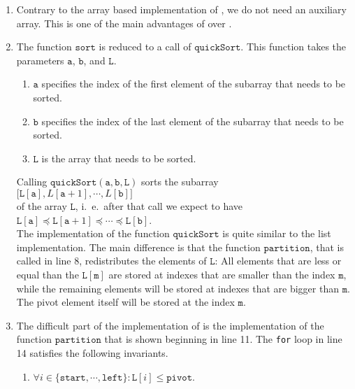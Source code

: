 \begin{enumerate}
\item Contrary to the array based implementation of , we do not need an auxiliary
      array.  This is one of the main advantages of  over .
\item The function $\mathtt{sort}$ is reduced to a call of $\mathtt{quickSort}$.  This function
      takes the parameters $\mathtt{a}$, $\mathtt{b}$, and $\mathtt{L}$.  
      \begin{enumerate}
      \item $\mathtt{a}$ specifies the index of the first element of the subarray that needs to be
            sorted.
      \item $\mathtt{b}$ specifies the index of the last element of the subarray that needs to be
            sorted. 
      \item $\mathtt{L}$ is the array that needs to be sorted.
      \end{enumerate}
      Calling $\mathtt{quickSort}(\mathtt{a}, \mathtt{b}, \mathtt{L})$ sorts the subarray \\[0.2cm]
      \hspace*{1.3cm} 
      $\bigl[\mathtt{L}[\mathtt{a}], L[\mathtt{a}+1], \cdots, L[\mathtt{b}]\bigr]$
      \\[0.2cm]
      of the array $\mathtt{L}$, i.~e.~after that call we expect to have\\[0.2cm]
      \hspace*{1.3cm} 
      $\mathtt{L}[\mathtt{a}] \preceq \mathtt{L}[\mathtt{a}+1] \preceq \cdots \preceq \mathtt{L}[\mathtt{b}]$.
      \\[0.2cm]
      The implementation of the function $\mathtt{quickSort}$
      is quite similar to the list implementation.  The main difference is that the function
      $\mathtt{partition}$, that is called in line 8, redistributes the elements of $\mathtt{L}$:
      All elements that are less or equal than the  $\mathtt{L[m]}$
      are stored at indexes that are smaller than the index $\mathtt{m}$, while the remaining elements will 
      be stored at indexes that are bigger than $\mathtt{m}$.  The pivot element itself will be stored at the
      index $\mathtt{m}$. 
\item The difficult part of the implementation of  is the implementation of the
      function $\mathtt{partition}$ that is shown beginning in line 11.
      The \texttt{for} loop in line 14 satisfies the following invariants.
      \begin{enumerate}
      \item $\forall i \in \{ \mathtt{start}, \cdots, \mathtt{left} \} : \mathtt{L}[i] \leq \mathtt{pivot}$.


\end{enumerate}
\end{enumerate}
